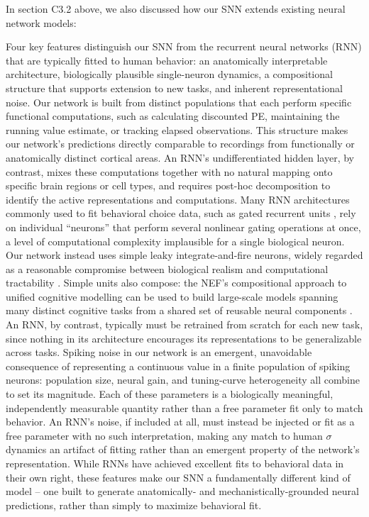 In section C3.2 above, we also discussed how our SNN extends existing neural network models:
\begin{ms}
Four key features distinguish our SNN from the recurrent neural networks (RNN) that are typically fitted to human behavior: an anatomically interpretable architecture, biologically plausible single-neuron dynamics, a compositional structure that supports extension to new tasks, and inherent representational noise. Our network is built from distinct populations that each perform specific functional computations, such as calculating discounted PE, maintaining the running value estimate, or tracking elapsed observations. This structure makes our network's predictions directly comparable to recordings from functionally or anatomically distinct cortical areas. An RNN's undifferentiated hidden layer, by contrast, mixes these computations together with no natural mapping onto specific brain regions or cell types, and requires post-hoc decomposition to identify the active representations and computations. Many RNN architectures commonly used to fit behavioral choice data, such as gated recurrent units \citep{jian2025discovering}, rely on individual ``neurons'' that perform several nonlinear gating operations at once, a level of computational complexity implausible for a single biological neuron. Our network instead uses simple leaky integrate-and-fire neurons, widely regarded as a reasonable compromise between biological realism and computational tractability \citep{eliasmith2013build, gerstner2014neuronal, dayan2005theoretical}. Simple units also compose: the NEF's compositional approach to unified cognitive modelling can be used to build large-scale models spanning many distinct cognitive tasks from a shared set of reusable neural components \citep{choo2018spaun}. An RNN, by contrast, typically must be retrained from scratch for each new task, since nothing in its architecture encourages its representations to be generalizable across tasks. Spiking noise in our network is an emergent, unavoidable consequence of representing a continuous value in a finite population of spiking neurons: population size, neural gain, and tuning-curve heterogeneity all combine to set its magnitude. Each of these parameters is a biologically meaningful, independently measurable quantity rather than a free parameter fit only to match behavior. An RNN's noise, if included at all, must instead be injected or fit as a free parameter with no such interpretation, making any match to human $\sigma$ dynamics an artifact of fitting rather than an emergent property of the network's representation. While RNNs have achieved excellent fits to behavioral data in their own right, these features make our SNN a fundamentally different kind of model -- one built to generate anatomically- and mechanistically-grounded neural predictions, rather than simply to maximize behavioral fit.
\end{ms}


